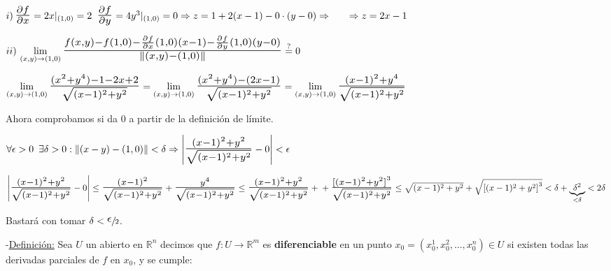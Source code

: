 \documentclass[10pt, titlepage]{article}
\newcommand{\eqc}[1]{\stackrel{\mathclap{\normalfont\mbox{\scriptsize{#1}}}}{=}}
\newcommand{\R}{\mathbb{R}}
\newcommand{\bfrac}[2]{\scalebox{1.4}{$\frac{#1}{#2}$}}
\newcommand{\spac}{\, \, \,}
\newcommand{\definicion}{\noindent-\underline{Definición:} }
\begin{document}
$i) \, \bfrac{\partial f}{\partial x} = 2x |_{(1, 0)} = 2 \spac \bfrac{\partial f}{\partial y} = 4 y^3 |_{(1, 0)} = 
0 \Rightarrow z = 1 + 2(x -1) - 0 \cdot (y - 0) \Rightarrow \\ \indent \Rightarrow z = 2x -1$
\vspace{3mm}

$ii) \, \displaystyle \lim_{(x, y) \to (1, 0)} \bfrac{f (x, y) - f(1, 0) - \frac{\partial f}{\partial x} (1, 0) (x -1) - 
\frac{\partial f}{\partial y} (1, 0) (y - 0)}{\|(x, y) - (1, 0)\|} \eqc{\text{?}} 0$
\vspace{2mm}

$\displaystyle \lim_{(x, y) \to (1, 0)} \bfrac{(x^2 + y^4) - 1 - 2x + 2}{\sqrt{ (x - 1)^2 + y^2}} = \lim_{(x, 
y) \to (1, 0)} \bfrac{(x^2 + y^4) - (2x - 1)}{\sqrt{(x - 1)^2 + y^2}} = \lim_{(x, y) \to (1, 0)} \bfrac{
(x - 1)^2 + y^4}{\sqrt{(x -1)^2 + y^2}}$
\vspace{3mm}

Ahora comprobamos si da 0 a partir de la definición de límite.
\vspace{2mm}

$\forall \epsilon > 0 \spac \exists \delta > 0 : \|(x - y) - (1, 0)\| < \delta \Rightarrow \left | \bfrac{(x - 1)^2 
+ y^2}{\sqrt{(x - 1)^2 + y^2}} - 0 \right | < \epsilon$
\vspace{3mm}

$\left | \bfrac{(x - 1)^2 + y^2}{\sqrt{(x - 1)^2 + y^2}} - 0 \right | \leq \bfrac{(x - 1)^2}{\sqrt{(x - 1)^2 + 
y^2}} + \bfrac{y^4}{\sqrt{(x - 1)^2 + y^2}} \leq \bfrac{(x - 1)^2 + y^2}{\sqrt{(x - 1)^2 + y^2}} + \\ + 
\bfrac{{[(x - 1)^2 + y^2]}^3}{\sqrt{(x - 1)^2 + y^2}} \leq \sqrt{(x - 1)^2 + y^2} + \sqrt{{[(x - 1)^2 + 
y^2]}^3} < \delta + \underbrace{\delta^2}_{< \delta} < 2 \delta$
\vspace{2mm}

Bastará con tomar $\delta < \sfrac{\scalebox{1.5}{$\epsilon$}}{2}$.
\vspace{5mm}


\definicion Sea $U$ un abierto en $\R^n$ decimos que $f : U  \to \R^m$ es \textbf{diferenciable} en un 
punto $x_0 = (x_0^1, x_0^2,..., x_0^n) \in U$ si existen todas las derivadas parciales de $f \text{ en } x_0$, 
y se cumple:
\end{document}
